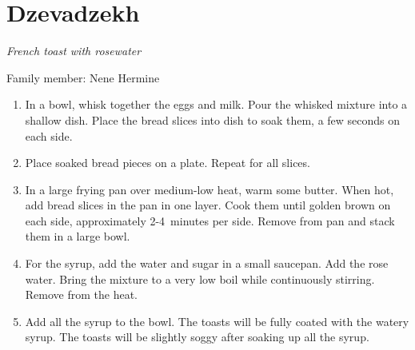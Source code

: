 \chapter{Dzevadzekh}
\label{ch:frenchtoast}


\textit{French toast with rosewater}

Family member: Nene Hermine

\begin{enumerate}
    \item In a bowl, whisk together the eggs and milk. Pour the whisked mixture into a shallow dish. Place the bread slices into dish to soak them, a few seconds on each side.
    \item Place soaked bread pieces on a plate. Repeat for all slices.
    \item In a large frying pan over medium-low heat, warm some butter. When hot, add bread slices in the pan in one layer. Cook them until golden brown on each side, approximately 2-4~minutes per side. Remove from pan and stack them in a large bowl.
    \item For the syrup, add the water and sugar in a small saucepan. Add the rose water. Bring the mixture to a very low boil while continuously stirring. Remove from the heat.
    \item Add all the syrup to the bowl. The toasts will be fully coated with the watery syrup. The toasts will be slightly soggy after soaking up all the syrup.
\end{enumerate}

